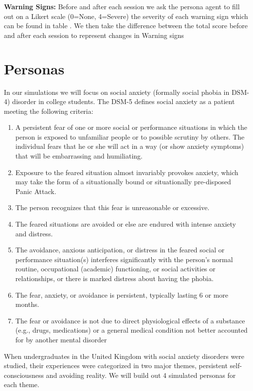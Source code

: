 \documentclass[twoside]{report}
\begin{document}
\textbf{Warning Signs:} Before and after each session we ask the persona agent to fill out on a Likert scale (0=None, 4=Severe) the severity of each warning sign which can be found in table . We then take the difference between the total score before and after each session to represent changes in Warning signs

\section{Personas}
In our simulations we will focus on social anxiety (formally social phobia in DSM-4) disorder in college students. The DSM-5 defines social anxiety as a patient meeting the following criteria: 
\begin{enumerate}
    \item A persistent fear of one or more social or performance situations in which the person is exposed to unfamiliar people or to possible scrutiny by others. The individual fears that he or she will act in a way (or show anxiety symptoms) that will be embarrassing and humiliating.
    \item Exposure to the feared situation almost invariably provokes anxiety, which may take the form of a situationally bound or situationally pre-disposed Panic Attack.  
    \item The person recognizes that this fear is unreasonable or excessive.
    \item The feared situations are avoided or else are endured with intense anxiety and distress.
    \item The avoidance, anxious anticipation, or distress in the feared social or performance situation(s) interferes significantly with the person's normal routine, occupational (academic) functioning, or social activities or relationships, or there is marked distress about having the phobia.
    \item The fear, anxiety, or avoidance is persistent, typically lasting 6 or more months.
    \item The fear or avoidance is not due to direct physiological effects of a substance (e.g., drugs, medications) or a general medical condition not better accounted for by another mental disorder
\end{enumerate}
When undergraduates in the United Kingdom with social anxiety disorders were studied, their experiences were categorized in two major themes, persistent self-consciousness and avoiding reality. We will build out 4 simulated personas for each theme.
\end{document}
